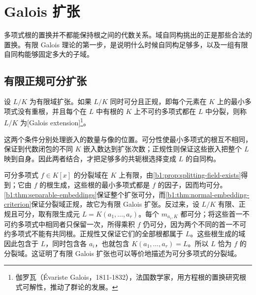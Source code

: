 
\section{Galois 扩张}
\label{b1:sec:1901}

%
%

多项式根的置换并不都能保持根之间的代数关系。域自同构挑出的正是那些合法的置换。有限 Galois 理论的第一步，是说明什么时候自同构足够多，以及一组有限自同构能够固定多大的子域。

\subsection{有限正规可分扩张}
\label{b1:subsec:1901:01}

\begin{definition}\label{b1:def:finite-galois-extension}
	设 \(L/K\) 为有限域扩张。如果 \(L/K\) 同时可分且正规，即每个元素在 \(K\) 上的最小多项式没有重根，并且每个在 \(L\) 中有根的 \(K\) 上不可约多项式都在 \(L\) 中分裂，则称 \(L/K\) 为[Galois extension]\footnote{伽罗瓦（Évariste Galois，1811-1832），法国数学家，用方程根的置换研究根式可解性，推动了群论的发展。}。
\end{definition}
这两个条件分别处理嵌入的数量与像的位置。可分性使最小多项式的根互不相同，保证到代数闭包的不同 \(K\) 嵌入数达到扩张次数；正规性则保证这些嵌入把整个 \(L\) 映到自身。因此两者结合，才把足够多的共轭根选择变成 \(L\) 的自同构。

\ProseParagraphBreak
可分多项式 \(f\in K[x]\) 的分裂域在 \(K\) 上有限，由\cref{b1:prop:splitting-field-exists}得到；它由 \(f\) 的根生成，这些根的最小多项式都是 \(f\) 的因子，因而均可分。\cref{b1:thm:separable-embeddings}保证整个扩张可分，而\cref{b1:thm:normal-embedding-criterion}保证分裂域正规，故它为有限 Galois 扩张。反过来，设 \(L/K\) 有限、正规且可分，取有限生成元 \(L=K(a_1,\ldots,a_r)\)。每个 \(m_{a_i,K}\) 都可分；将这些首一不可约多项式中相同者只保留一次，所得乘积 \(f\) 仍可分，因为两个不同的首一不可约多项式不能有共同根。正规性又保证它们的全部根都属于 \(L\)。这些根生成的域因此包含于 \(L\)，同时包含各 \(a_i\)，也就包含 \(K(a_1,\ldots,a_r)=L\)。所以 \(L\) 恰为 \(f\) 的分裂域。这证明了有限 Galois 扩张也可以等价地描述为可分多项式的分裂域。

